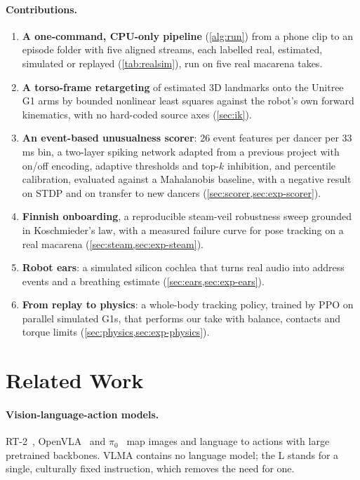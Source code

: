 \documentclass[10pt]{article}
\newcommand{\vlma}{\textsc{VLMA}}
\begin{document}
\paragraph{Contributions.}
\begin{enumerate}[label=\textbf{C\arabic*.}]
  \item \textbf{A one-command, CPU-only pipeline} (\cref{alg:run}) from a phone clip to an episode folder with five aligned streams, each labelled real, estimated, simulated or replayed (\cref{tab:realsim}), run on five real macarena takes.
  \item \textbf{A torso-frame retargeting} of estimated 3D landmarks onto the Unitree G1 arms by bounded nonlinear least squares against the robot's own forward kinematics, with no hard-coded source axes (\cref{sec:ik}).
  \item \textbf{An event-based unusualness scorer}: 26 event features per dancer per 33\,ms bin, a two-layer spiking network adapted from a previous project with on/off encoding, adaptive thresholds and top-$k$ inhibition, and percentile calibration, evaluated against a Mahalanobis baseline, with a negative result on STDP and on transfer to new dancers (\cref{sec:scorer,sec:exp-scorer}).
  \item \textbf{Finnish onboarding}, a reproducible steam-veil robustness sweep grounded in Koschmieder's law, with a measured failure curve for pose tracking on a real macarena (\cref{sec:steam,sec:exp-steam}).
  \item \textbf{Robot ears}: a simulated silicon cochlea that turns real audio into address events and a breathing estimate (\cref{sec:ears,sec:exp-ears}).
  \item \textbf{From replay to physics}: a whole-body tracking policy, trained by PPO on \PhysEnvs{} parallel simulated G1s, that performs our take with balance, contacts and torque limits (\cref{sec:physics,sec:exp-physics}).
\end{enumerate}

\section{Related Work}
\label{sec:related}

\paragraph{Vision-language-action models.} RT-2~\cite{brohan2023rt2}, OpenVLA~\cite{kim2024openvla} and $\pi_0$~\cite{black2024pi0} map images and language to actions with large pretrained backbones. \vlma{} contains no language model; the L stands for a single, culturally fixed instruction, which removes the need for one.
\end{document}
